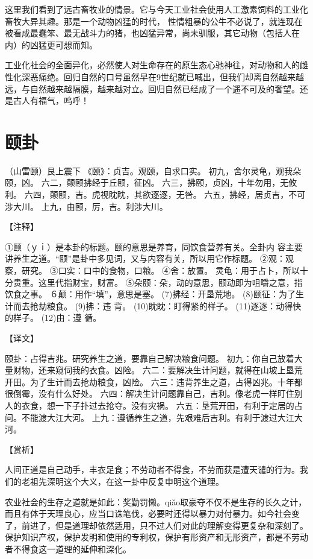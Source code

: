 \documentclass[a4paper,12pt,UTF8,twoside]{ctexbook}
\begin{document}
这里我们看到了远古畜牧业的情景。它与今天工业社会使用人工激素饲料的工业化畜牧大异其趣。那是一个动物凶猛的时代， 性情粗暴的公牛不必说了，就连现在被看成最蠢笨、最无战斗力的猪，也凶猛异常，尚未驯服，其它动物（包括人在内）的凶猛更可想而知。

工业化社会的全面异化，必然使人对生命存在的原生态心驰神往，对动物和人的雌性化深恶痛绝。回归自然的口号虽然早在9世纪就已喊出，但我们却离自然越来越远，与自然越来越隔膜，越来越对立。回归自然已经成了一个遥不可及的奢望。还是古人有福气，呜呼！

\chapter{颐卦}

（山雷颐）艮上震下
《颐》：贞吉。观颐，自求口实。
初九，舍尔灵龟，观我朵颐，凶。
六二，颠颐拂经于丘颐，征凶。
六三，拂颐，贞凶，十年勿用，无攸利。
六四，颠颐，吉。虎视眈眈，其欲逐逐，无咎。
六五，拂经，居贞吉，不可涉大川。
上九，由颐，厉，吉。利涉大川。

【注释】

①颐（ｙｉ）是本卦的标题。颐的意思是养育，同饮食营养有关。全卦内 容主要讲养生之道。“颐”是卦中多见词，又与内容有关，所以用它作标题。
②观：观察，研究。
③口实：口中的食物，口粮。
④舍：放置。 灵龟：用于占卜，所以十分贵重。这里代指财宝，财富。
⑤朵颐：朵，动的意思，颐动即为咀嚼之意，指饮食之事。
６颠：用作“填”，意思是塞。
(7)拂经：开垦荒地。
(8)颐征：为了生计而去抢劫粮食。
(9)拂：违 背。
(10)眈眈：盯得紧的样子。
(11)逐逐：动得快的样子。
(12)由：遵 循。

【译文】

颐卦：占得吉兆。研究养生之道，要靠自己解决粮食问题。
初九：你自己放着大量财物，还来窥伺我的衣食。凶险。
六二：要解决生计问题，就得在山坡上垦荒开田。为了生计而去抢劫粮食，凶险。
六三：违背养生之道，占得凶兆。十年都很倒霉，没有什么好处。
六四：解决生计问题靠自己，吉利。像老虎一样盯住别人的衣食，想一下子扑过去抢夺。没有灾祸。
六五：垦荒开田，有利于定居的占问。不能渡大江大河。
上九：遵循养生之道，先艰难后吉利。有利于渡过大江大河。

【赏析】

人间正道是自己动手，丰衣足食；不劳动者不得食，不劳而获是遭天谴的行为。我们的老祖先深明这个大义，在这一卦中反复申明这个道理。

农业社会的生存之道就是如此：奖勤罚懒。qiǎo取豪夺不仅不是生存的长久之计，而且有体于天理良心，应当口诛笔伐，必要时还得以暴力对付暴力。如今社会变了，前进了，但是道理却依然适用，只不过人们对此的理解变得更复杂和深刻了。保护知识产权，保护发明和使用的专利权，保护有形资产和无形资产，都是不劳动者不得食这一道理的延伸和深化。
\end{document}
